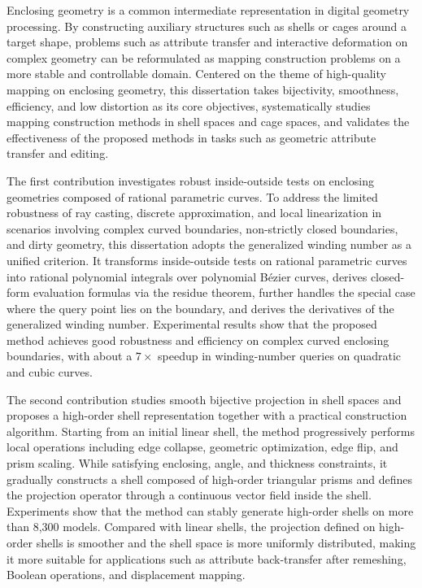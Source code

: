 \begin{abstract*}
Enclosing geometry is a common intermediate representation in digital geometry processing. By constructing auxiliary structures such as shells or cages around a target shape, problems such as attribute transfer and interactive deformation on complex geometry can be reformulated as mapping construction problems on a more stable and controllable domain. Centered on the theme of high-quality mapping on enclosing geometry, this dissertation takes bijectivity, smoothness, efficiency, and low distortion as its core objectives, systematically studies mapping construction methods in shell spaces and cage spaces, and validates the effectiveness of the proposed methods in tasks such as geometric attribute transfer and editing.

The first contribution investigates robust inside-outside tests on enclosing geometries composed of rational parametric curves. To address the limited robustness of ray casting, discrete approximation, and local linearization in scenarios involving complex curved boundaries, non-strictly closed boundaries, and dirty geometry, this dissertation adopts the generalized winding number as a unified criterion. It transforms inside-outside tests on rational parametric curves into rational polynomial integrals over polynomial B\'{e}zier curves, derives closed-form evaluation formulas via the residue theorem, further handles the special case where the query point lies on the boundary, and derives the derivatives of the generalized winding number. Experimental results show that the proposed method achieves good robustness and efficiency on complex curved enclosing boundaries, with about a $7\times$ speedup in winding-number queries on quadratic and cubic curves.

The second contribution studies smooth bijective projection in shell spaces and proposes a high-order shell representation together with a practical construction algorithm. Starting from an initial linear shell, the method progressively performs local operations including edge collapse, geometric optimization, edge flip, and prism scaling. While satisfying enclosing, angle, and thickness constraints, it gradually constructs a shell composed of high-order triangular prisms and defines the projection operator through a continuous vector field inside the shell. Experiments show that the method can stably generate high-order shells on more than 8,300 models. Compared with linear shells, the projection defined on high-order shells is smoother and the shell space is more uniformly distributed, making it more suitable for applications such as attribute back-transfer after remeshing, Boolean operations, and displacement mapping.


\end{abstract*}
